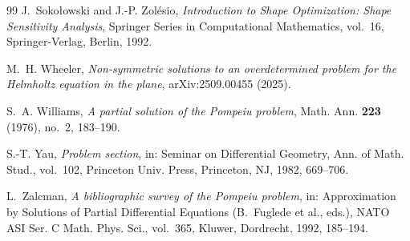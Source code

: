 \documentclass[11pt]{amsart}
\theoremstyle{definition}
\theoremstyle{remark}
\numberwithin{equation}{section}
\begin{document}
\begin{thebibliography}{99}
J.~Soko{\l}owski and J.-P. Zol\'esio, \emph{Introduction to Shape Optimization: Shape Sensitivity Analysis}, Springer Series in Computational Mathematics, vol.~16, Springer-Verlag, Berlin, 1992.

M.~H. Wheeler, \emph{Non-symmetric solutions to an overdetermined problem for the Helmholtz equation in the plane}, arXiv:2509.00455 (2025).

S.~A. Williams, \emph{A partial solution of the Pompeiu problem}, Math. Ann. \textbf{223} (1976), no.~2, 183--190.

S.-T. Yau, \emph{Problem section}, in: Seminar on Differential Geometry, Ann. of Math. Stud., vol.~102, Princeton Univ. Press, Princeton, NJ, 1982, 669--706.

L.~Zalcman, \emph{A bibliographic survey of the Pompeiu problem}, in: Approximation by Solutions of Partial Differential Equations (B.~Fuglede et al., eds.), NATO ASI Ser. C Math. Phys. Sci., vol.~365, Kluwer, Dordrecht, 1992, 185--194.

\end{thebibliography}
\end{document}
